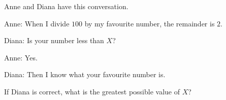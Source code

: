 Anne and Diana have this conversation.

Anne: When I divide $100$ by my favourite number, the remainder is $2$.

Diana: Is your number less than $X$?

Anne: Yes.

Diana: Then I know what your favourite number is.

If Diana is correct, what is the greatest possible value of $X$?
